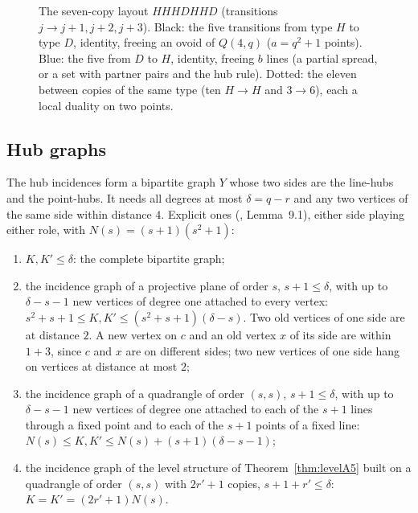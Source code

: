 \documentclass[11pt]{amsart}
\theoremstyle{definition}
\theoremstyle{remark}
\begin{document}
\begin{figure}[ht]
\centering
{}
\caption{The seven-copy layout $HHHDHHD$ (transitions $j\to j+1,j+2,j+3$). Black: the five transitions from type $H$ to type $D$, identity, freeing an ovoid of $Q(4,q)$ ($a=q^2+1$ points). Blue: the five from $D$ to $H$, identity, freeing $b$ lines (a partial spread, or a set with partner pairs and the hub rule). Dotted: the eleven between copies of the same type (ten $H\to H$ and $3\to6$), each a local duality on two points.}
\label{fig:layout7}
\end{figure}

\subsection{Hub graphs}\label{ssec:hubgraphs}
The hub incidences form a bipartite graph $Y$ whose two sides are the line-hubs and the point-hubs. It needs all degrees at most $\delta=q-r$ and any two vertices of the same side within distance $4$. Explicit ones (, Lemma~9.1), either side playing either role, with $N(s)=(s+1)(s^2+1)$:
\begin{enumerate}[label=\textup{(Y\arabic*)},leftmargin=3em,start=0]
\item $K,K'\le\delta$: the complete bipartite graph;
\item the incidence graph of a projective plane of order $s$, $s+1\le\delta$, with up to $\delta-s-1$ new vertices of degree one attached to every vertex: $s^2+s+1\le K,K'\le(s^2+s+1)(\delta-s)$. Two old vertices of one side are at distance $2$. A new vertex on $c$ and an old vertex $x$ of its side are within $1+3$, since $c$ and $x$ are on different sides; two new vertices of one side hang on vertices at distance at most $2$;
\item the incidence graph of a quadrangle of order $(s,s)$, $s+1\le\delta$, with up to $\delta-s-1$ new vertices of degree one attached to each of the $s+1$ lines through a fixed point and to each of the $s+1$ points of a fixed line: $N(s)\le K,K'\le N(s)+(s+1)(\delta-s-1)$;
\item the incidence graph of the level structure of Theorem~\ref{thm:levelA5} built on a quadrangle of order $(s,s)$ with $2r'+1$ copies, $s+1+r'\le\delta$: $K=K'=(2r'+1)N(s)$.
\end{enumerate}
\end{document}
